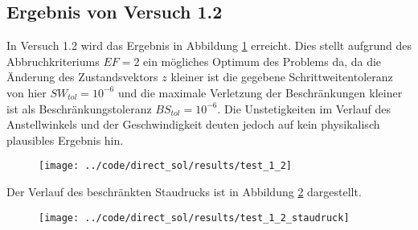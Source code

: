\subsection{Ergebnis von Versuch 1.2}\label{kap:Versuch12}
In Versuch 1.2 wird das Ergebnis in Abbildung \ref{img:test_1_2} erreicht. Dies stellt aufgrund des Abbruchkriteriums $EF = 2$ ein mögliches Optimum des Problems da, da die Änderung des Zustandsvektors $z$ kleiner ist die gegebene Schrittweitentoleranz von hier $SW_{tol} = 10^{-6}$ und die maximale Verletzung der Beschränkungen kleiner ist als Beschränkungstoleranz $BS_{tol} = 10^{-6}$. Die Unstetigkeiten im Verlauf des Anstellwinkels und der Geschwindigkeit deuten jedoch auf kein physikalisch plausibles Ergebnis hin.
\begin{figure}[H]
\begin{center}
\texttt{[image: ../code/direct\_sol/results/test\_1\_2]}
 \label{img:test_1_2}
\end{center}
\end{figure}
Der Verlauf des beschränkten Staudrucks ist in Abbildung \ref{img:test_1_2_staudruck} dargestellt.
\begin{figure}[H]
\begin{center}
\texttt{[image: ../code/direct\_sol/results/test\_1\_2\_staudruck]}
 \label{img:test_1_2_staudruck}
\end{center}
\end{figure}
















\newpage
